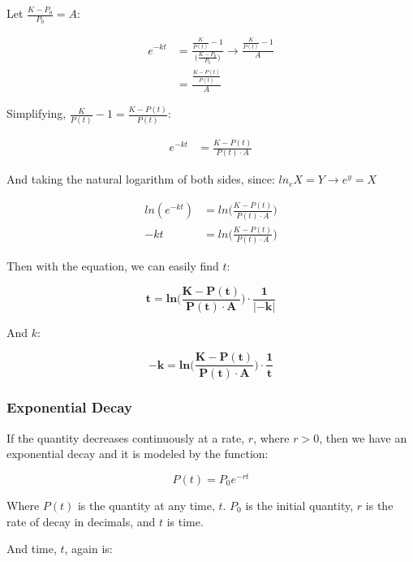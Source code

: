 \documentclass[12pt, UTF8]{article}
\begin{document}
	Let $\frac{K - P_{0}}{P_0} = A$:

	\begin{align}
		e^{-kt} &= \frac{\frac{K}{P(t)} - 1}{\big(\frac{K - P_{0}}{P_{0}}\big)} \longrightarrow \frac{\frac{K}{P(t)} - 1}{A} \\
		&= \frac{\frac{K - P(t)}{P(t)}}{A}
	\end{align}

	Simplifying, $\frac{K}{P(t)} -1 = \frac{K - P(t)}{P(t)}$:

	\begin{align}
		e^{-kt} &= \frac{K - P(t)}{P(t) \cdot A}
	\end{align}

	And taking the natural logarithm of both sides, since: $ln_{e} X = Y \longrightarrow e^{y} = X$

	\begin{align}
		ln(e^{-kt}) &= ln\big(\frac{K - P(t)}{P(t) \cdot A}\big)  \nonumber \\
		-kt &= ln\big(\frac{K - P(t)}{P(t) \cdot A}\big)
	\end{align}

	Then with the equation, we can easily find $t$:

	\begin{equation}
		\boldsymbol{t} = \boldsymbol{ln\big(\frac{K - P(t)}{P(t) \cdot A}\big) \cdot \frac{1}{|-k|}}
	\end{equation}

	And $k$:

	\begin{equation}
		\boldsymbol{-k} = \boldsymbol{ln\big(\frac{K - P(t)}{P(t) \cdot A}\big) \cdot \frac{1}{t}}
	\end{equation}

	\subsubsection*{Exponential Decay}

	If the quantity decreases continuously at a rate, $r$, where $r > 0$, then we have an exponential decay and it is modeled by the function:

	\begin{equation}
		P(t) = P_{0} e^{-rt}
	\end{equation}

	Where $P(t)$ is the quantity at any time, $t$. $P_{0}$ is the initial quantity, $r$ is the rate of decay in decimals, and $t$ is time.

	And time, $t$, again is:
\end{document}
